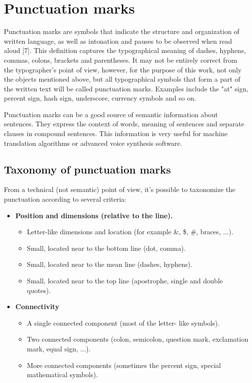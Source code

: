 \documentclass[12pt,a4paper]{report}
\begin{document}
\section{Punctuation marks}
Punctuation marks are symbols that indicate the structure and organization of written language, as well as intonation and pauses to be observed when read aloud [7]. This definition captures the typographical meaning of dashes, hyphens, commas, colons, brackets and parentheses. It may not be entirely correct from the typographer's point of view, however, for the purpose of this work, not only the objects mentioned above, but all typographical symbols that form a part of the written text will be called punctuation marks. Examples include the "at" sign, percent sign, hash sign, underscore, currency symbols and so on.

Punctuation marks can be a good source of semantic information about sentences. They express the context of words, meaning of sentences and separate clauses in compound sentences. This information is very useful for machine translation algorithms or advanced voice synthesis software.

\subsection{Taxonomy of punctuation marks}
From a technical (not semantic) point of view, it's possible to taxonomize the punctuation according to several criteria:

\begin{itemize}
    \item \textbf{Position and dimensions (relative to the line).}
    \begin{itemize}
        \item Letter-like dimensions and location (for example \&, \$, \#, braces, ...).
        \item Small, located near to the bottom line (dot, comma).
        \item Small, located near to the mean line (dashes, hyphens).
        \item Small, located near to the top line (apostrophe, single and double quotes).
    \end{itemize}
    \item \textbf{Connectivity}
    \begin{itemize}
        \item A single connected component (most of the letter- like symbols).
        \item Two connected components (colon, semicolon, question mark, exclamation mark, equal sign, ...).
        \item More connected components (sometimes the percent sign, special mathematical symbols).
    \end{itemize}
\end{itemize}
\end{document}
